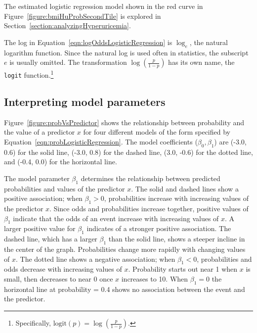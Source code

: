 The estimated logistic regression model shown in the red curve in Figure~\ref{figure:bmiHuProbSecondTile} is explored in Section~\ref{section:analyzingHyperuricemia}.

The log in Equation~\ref{eqn:logOddsLogisticRegression} is $\log_e$, the natural logarithm function.  Since the natural log is used often in statistics, the subscript $e$ is usually omitted. The transformation $\log(\frac{p}{1-p})$ has its own name, the \texttt{logit} function.\footnote{Specifically, $\text{logit}(p) = \log(\frac{p}{1-p})$.}

\newpage
\subsection{Interpreting model parameters}

Figure~\ref{figure:probVsPredictor} shows the relationship between probability and the value of a predictor $x$ for four different models of the form specified by Equation~\ref{eqn:probLogisticRegression}. The model coefficients ($\beta_0, \beta_1$) are (-3.0, 0.6) for the solid line, (-3.0, 0.8) for the dashed line, (3.0, -0.6) for the dotted line, and (-0.4, 0.0) for the horizontal line.

The model parameter $\beta_1$ determines the relationship between predicted probabilities and values of the predictor $x$. The solid and dashed lines show a positive association; when $\beta_1 > 0$, probabilities increase with increasing values of the predictor $x$. Since odds and probabilities increase together, positive values of $\beta_1$ indicate that the odds of an event increase with increasing values of $x$. A larger positive value for $\beta_1$ indicates of a stronger positive association. The dashed line, which has a larger $\beta_1$ than the solid line, shows a steeper incline in the center of the graph. Probabilities change more rapidly with changing values of $x$. The dotted line shows a negative association; when $\beta_1 < 0$, probabilities and odds decrease with increasing values of $x$. Probability starts out near 1 when $x$ is small, then decreases to near 0 once $x$ increases to 10. When $\beta_1 = 0$ the horizontal line at probability = 0.4 shows no association between the event and the predictor.


